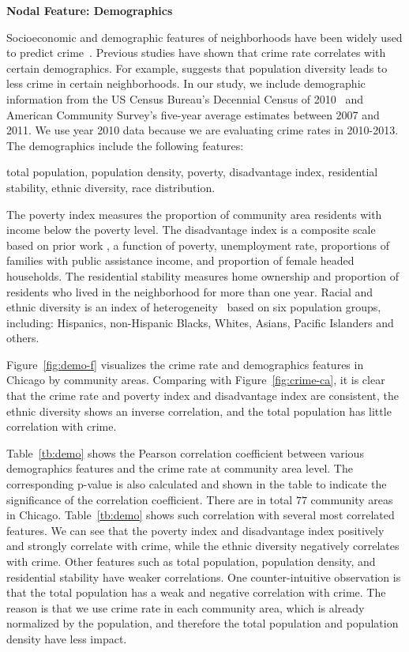 \textbf{Nodal Feature: Demographics}

Socioeconomic and demographic features of neighborhoods have been
widely used to predict crime~\cite{Bogo14, HsPu93, WoMe12, SaHi07}. Previous studies have shown that crime rate correlates with certain demographics. For example, \cite{Jac61, GrSa09} suggests that population diversity leads to less crime in certain neighborhoods. 
In our study, we include demographic information from the US Census Bureau's Decennial Census of 2010~\cite{census-data} and American Community Survey's five-year average estimates
between 2007 and 2011. We use year 2010 data because we are evaluating crime rates in 2010-2013. The demographics include the following features:

\textsf{total population, population density, poverty, disadvantage index, residential stability, ethnic diversity, race distribution}.


The poverty index measures the proportion of community area residents
with income below the poverty level. The disadvantage index is
a composite scale based on prior work \cite{SRE97}, a function of 
poverty, unemployment rate, proportions of families with public
assistance income, and proportion of female headed households. 
 The residential stability measures home ownership and proportion of
residents who lived in the neighborhood for more than one year. Racial
and ethnic diversity is an index of heterogeneity~\cite{GrSa09} based on six
population groups, including: Hispanics, non-Hispanic Blacks, Whites,
Asians, Pacific Islanders and others.


Figure~\ref{fig:demo-f} visualizes the crime rate and demographics features in Chicago by community areas. Comparing with Figure~\ref{fig:crime-ca}, it is clear that the crime rate and poverty index and disadvantage index are consistent,  the ethnic diversity shows an inverse correlation, and the total population has little correlation with crime.



Table~\ref{tb:demo} shows the Pearson correlation coefficient between various demographics features and the crime rate at community area level. The corresponding p-value is also calculated and shown in the table to indicate the significance of the correlation coefficient.  There  are in total $77$  community areas in Chicago. Table~\ref{tb:demo} shows such correlation with several most correlated features. We can see that the poverty index and disadvantage index positively and strongly correlate with crime, while the ethnic diversity negatively correlates with crime. Other features such as total population, population density, and residential stability  have weaker correlations. One counter-intuitive observation is that the total population has a weak and negative correlation with crime. The reason is that we use crime rate in each community area, which is already normalized by the population, and therefore the total population and population density have less impact. 


